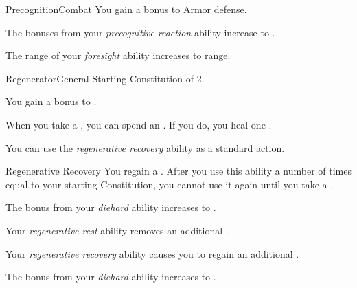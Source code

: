\begin{feat}{Precognition}{Combat}
         You gain a  bonus to Armor defense.

         The bonuses from your \textit{precognitive reaction} ability increase to .

         The range of your \textit{foresight} ability increases to \rngmed range.
    \end{feat}

    \begin{feat}{Regenerator}{General}
        \featpre Starting Constitution of 2.

         You gain a  bonus to .

         When you take a , you can spend an . If you do, you heal one .

         You can use the \textit{regenerative recovery} ability as a standard action.
        \begin{freeability}{Regenerative Recovery}
            You regain a .
            After you use this ability a number of times equal to your starting Constitution, you cannot use it again until you take a .
        \end{freeability}

         The bonus from your \textit{diehard} ability increases to .

         Your \textit{regenerative rest} ability removes an additional .

         Your \textit{regenerative recovery} ability causes you to regain an additional .

         The bonus from your \textit{diehard} ability increases to .
    \end{feat}

